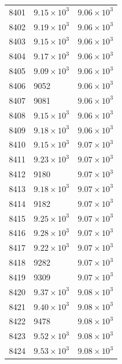 \begin{table}[H]
\begin{tabular}{lll}
8401 & $\displaystyle 9.15 \times 10^{3}$ & $\displaystyle 9.06 \times 10^{3}$ \\
8402 & $\displaystyle 9.19 \times 10^{3}$ & $\displaystyle 9.06 \times 10^{3}$ \\
8403 & $\displaystyle 9.15 \times 10^{3}$ & $\displaystyle 9.06 \times 10^{3}$ \\
8404 & $\displaystyle 9.17 \times 10^{3}$ & $\displaystyle 9.06 \times 10^{3}$ \\
8405 & $\displaystyle 9.09 \times 10^{3}$ & $\displaystyle 9.06 \times 10^{3}$ \\
8406 & 9052 & $\displaystyle 9.06 \times 10^{3}$ \\
8407 & 9081 & $\displaystyle 9.06 \times 10^{3}$ \\
8408 & $\displaystyle 9.15 \times 10^{3}$ & $\displaystyle 9.06 \times 10^{3}$ \\
8409 & $\displaystyle 9.18 \times 10^{3}$ & $\displaystyle 9.06 \times 10^{3}$ \\
8410 & $\displaystyle 9.15 \times 10^{3}$ & $\displaystyle 9.07 \times 10^{3}$ \\
8411 & $\displaystyle 9.23 \times 10^{3}$ & $\displaystyle 9.07 \times 10^{3}$ \\
8412 & 9180 & $\displaystyle 9.07 \times 10^{3}$ \\
8413 & $\displaystyle 9.18 \times 10^{3}$ & $\displaystyle 9.07 \times 10^{3}$ \\
8414 & 9182 & $\displaystyle 9.07 \times 10^{3}$ \\
8415 & $\displaystyle 9.25 \times 10^{3}$ & $\displaystyle 9.07 \times 10^{3}$ \\
8416 & $\displaystyle 9.28 \times 10^{3}$ & $\displaystyle 9.07 \times 10^{3}$ \\
8417 & $\displaystyle 9.22 \times 10^{3}$ & $\displaystyle 9.07 \times 10^{3}$ \\
8418 & 9282 & $\displaystyle 9.07 \times 10^{3}$ \\
8419 & 9309 & $\displaystyle 9.07 \times 10^{3}$ \\
8420 & $\displaystyle 9.37 \times 10^{3}$ & $\displaystyle 9.08 \times 10^{3}$ \\
8421 & $\displaystyle 9.40 \times 10^{3}$ & $\displaystyle 9.08 \times 10^{3}$ \\
8422 & 9478 & $\displaystyle 9.08 \times 10^{3}$ \\
8423 & $\displaystyle 9.52 \times 10^{3}$ & $\displaystyle 9.08 \times 10^{3}$ \\
8424 & $\displaystyle 9.53 \times 10^{3}$ & $\displaystyle 9.08 \times 10^{3}$ \\

\end{tabular}
\end{table}
